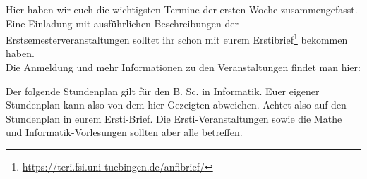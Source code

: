 
Hier haben wir euch die wichtigsten Termine der ersten Woche
zusammengefasst. Eine Einladung mit ausführlichen Beschreibungen der
Erstsemesterveranstaltungen solltet ihr schon mit eurem
Erstibrief\footnote{\url{https://teri.fsi.uni-tuebingen.de/anfibrief/}}
bekommen haben.\\
Die Anmeldung und mehr Informationen zu den Veranstaltungen findet man hier:


\newcommand{\event}{\cellcolor{lightlightgray}}

Der folgende Stundenplan gilt für den B. Sc. in Informatik. Euer eigener Stundenplan kann also von dem hier Gezeigten abweichen. Achtet also auf den Stundenplan in eurem Ersti-Brief. Die Ersti-Veranstaltungen sowie die Mathe und Informatik-Vorlesungen sollten aber alle betreffen. 


